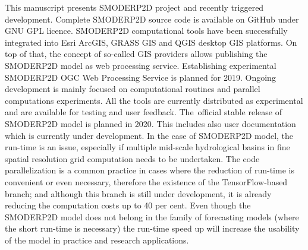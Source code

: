 This manuscript presents SMODERP2D project and recently triggered 
development. Complete SMODERP2D source code is available on GitHub 
\cite{xxx} under GNU GPL licence. SMODERP2D computational tools have 
been successfully integrated into Esri ArcGIS, GRASS GIS and QGIS desktop GIS platforms. On top of that, the concept of so-called GIS providers allows publishing the SMODERP2D model as web processing service. Establishing experimental SMODERP2D 
OGC Web Processing Service is planned for 2019. Ongoing development 
is mainly focused on computational routines and parallel computations experiments. All the tools are currently distributed as experimental and are available for testing and user feedback.
The~official stable release of SMODERP2D model is planned in 2020. This 
includes also user documentation which is currently under development. 
In the 
case of SMODERP2D model, the run-time is an issue, especially 
if multiple mid-scale hydrological basins in fine spatial 
resolution grid computation needs to be undertaken. The code parallelization
is a common practice in cases where 
the reduction of run-time is convenient or even necessary, therefore
the existence of the TensorFlow-based branch; and although this branch is still
under development, it is already reducing the computation costs up to 40 per
cent. Even 
though the SMODERP2D model does not belong in the family of forecasting 
models (where the short run-time is necessary)  the run-time speed 
up will increase the usability of the model in practice and research applications. 
